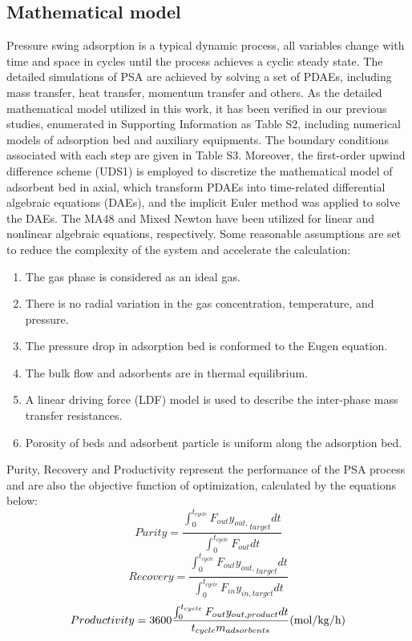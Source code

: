\documentclass[preprint,12pt]{elsarticle}
\begin{document}
	\subsection{Mathematical model}
	Pressure swing adsorption is a typical dynamic process, all variables change with time and space in cycles until the process achieves a cyclic steady state. The detailed simulations of PSA are achieved by solving a set of PDAEs, including mass transfer, heat transfer, momentum transfer and others. As the detailed mathematical model utilized in this work, it has been verified in our previous studies, enumerated in Supporting Information as Table S2, including numerical models of adsorption bed and auxiliary equipments. The boundary conditions associated with each step are given in Table S3. Moreover, the first-order upwind difference scheme (UDS1) is employed to discretize the mathematical model of adsorbent bed in axial, which transform PDAEs into time-related differential algebraic equations (DAEs), and the implicit Euler method was applied to solve the DAEs. The MA48 and Mixed Newton have been utilized for linear and nonlinear algebraic equations, respectively. Some reasonable assumptions are set to reduce the complexity of the system and accelerate the calculation:
	\begin{enumerate}
		\itemsep=0pt
		\item The gas phase is considered as an ideal gas.
		\item There is no radial variation in the gas concentration, temperature, and pressure.
		\item The pressure drop in adsorption bed is conformed to the Eugen equation.
		\item The bulk flow and adsorbents are in thermal equilibrium. 
		\item A linear driving force (LDF) model is used to describe the inter-phase mass transfer resistances.
		\item Porosity of beds and adsorbent particle is uniform along the adsorption bed.
	\end{enumerate}  
	Purity, Recovery and Productivity represent the performance of the PSA process and are also the objective function of optimization, calculated by the equations below:
	\begin{equation}
		Purity = \frac{{\int_0^{{t_{cycle}}} {{F_{out}}{y_{out,}}_{target}} dt}}{{\int_0^{{t_{cycle}}} {{F_{out}}dt} }}\label{Purity}
	\end{equation}
	\begin{equation}
		Recovery = \frac{{\int_0^{{t_{cycle}}} {{F_{out}}{y_{out,}}_{target}} dt}}{{\int_0^{{t_{cycle}}} {{F_{in}}{y_{in,target}}dt} }}\label{Recovery}
	\end{equation}
	\begin{equation}
		Productivity = 3600\frac{{\int_0^{{t_{cycle}}} {{F_{out}}{y_{out,product}}dt} }}{{{t_{cycle}}{m_{adsorbents}}}}   {\rm{(mol/kg/h)}}\label{Productivity}
	\end{equation}
\end{document}
